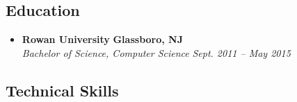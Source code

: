 \documentclass[11pt, letterpaper]{article}
\begin{document}
\begin{itemize}
\begin{comment} %
  \item
  \headerrow
    {\textbf{Rowan University}}
    {\textbf{Glassboro, NJ}}
  \\
  \headerrow
    {\emph{Web Developer, History Department}}
    {\emph{Nov. 2013 -- May 2015}}
  \begin{itemize*}
    \item[$\circ$] Updated and maintained the History Department's website
  \end{itemize*}
  \headerrow
    {\emph{Network Assistant, Network \& System Services}}
    {\emph{July 2014 -- Sept. 2014}}
  \begin{itemize*}
    \item[$\circ$] Installed and maintained network infrastructure across the Glassboro campus
  \end{itemize*}
\end{comment}

\end{itemize}

\subsection*{Education}

\begin{itemize}
  \parskip=0.1em

  \item
  \headerrow
    {\textbf{Rowan University}}
    {\textbf{Glassboro, NJ}}
  \\
  \headerrow
    {\emph{Bachelor of Science, Computer Science}}
    {\emph{Sept. 2011 -- May 2015}}

\end{itemize}

\subsection*{Technical Skills}
\end{document}
